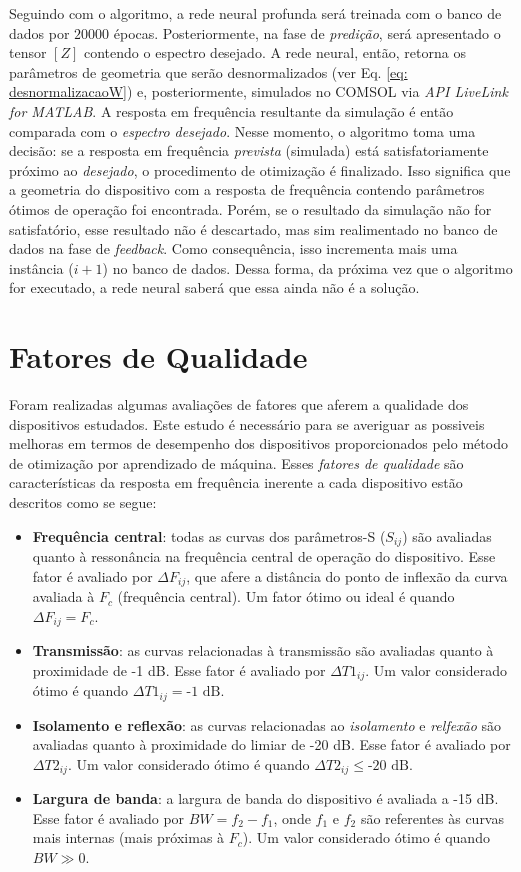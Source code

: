 Seguindo com o algoritmo, a rede neural profunda será treinada com o banco de dados por $20000$ épocas. Posteriormente, na fase de \textit{predição}, será apresentado o tensor $[Z]$ contendo o espectro desejado. A rede neural, então, retorna os parâmetros de geometria que serão desnormalizados (ver Eq. \ref{eq: desnormalizacaoW}) e, posteriormente, simulados no COMSOL via \textit{API LiveLink for MATLAB}. A resposta em frequência resultante da simulação é então comparada com o \textit{espectro desejado}. Nesse momento, o algoritmo toma uma decisão: se a resposta em frequência \textit{prevista} (simulada) está satisfatoriamente próximo ao \textit{desejado}, o procedimento de otimização é finalizado. Isso significa que a geometria do dispositivo com a resposta de frequência contendo parâmetros ótimos de operação foi encontrada. Porém, se o resultado da simulação não for satisfatório, esse resultado não é descartado, mas sim realimentado no banco de dados na fase de \textit{feedback}. Como consequência, isso incrementa mais uma instância ($i + 1$) no banco de dados. Dessa forma, da próxima vez que o algoritmo for executado, a rede neural saberá que essa ainda não é a solução.


\section{Fatores de Qualidade}

Foram realizadas algumas avaliações de fatores que aferem a qualidade dos dispositivos estudados. Este estudo é necessário para se averiguar as possiveis melhoras em termos de desempenho dos dispositivos proporcionados pelo método de otimização por aprendizado de máquina. Esses \textit{fatores de qualidade} são características da resposta em frequência inerente a cada dispositivo estão descritos como se segue:

\begin{itemize}
	\item \textbf{Frequência central}: todas as curvas dos parâmetros-S ($S_{ij}$) são avaliadas quanto à ressonância na frequência central de operação do dispositivo. Esse fator é avaliado por $\Delta F_{ij}$, que afere a distância do ponto de inflexão da curva avaliada à $F_{c}$ (frequência central). Um fator ótimo ou ideal é quando $\Delta F_{ij} = F_{c}$.
	\item \textbf{Transmissão}: as curvas relacionadas à transmissão são avaliadas quanto à proximidade de -1 dB. Esse fator é avaliado por $\Delta T1_{ij}$. Um valor considerado ótimo é quando $\Delta T1_{ij} = \textrm{-1 dB}$.
	\item \textbf{Isolamento e reflexão}: as curvas relacionadas ao \textit{isolamento} e \textit{relfexão} são avaliadas quanto à proximidade do limiar de -20 dB. Esse fator é avaliado por $\Delta T2_{ij}$. Um valor considerado ótimo é quando $\Delta T2_{ij} \leq \textrm{-20 dB}$.
	\item \textbf{Largura de banda}: a largura de banda do dispositivo é avaliada a -15 dB. Esse fator é avaliado por $BW = f_{2} - f_{1}$, onde $f_{1}$ e $f_{2}$ são referentes às curvas mais internas (mais próximas à $F_{c}$). Um valor considerado ótimo é quando $BW \gg 0$.
\end{itemize}

